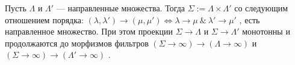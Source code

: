 \SSsect Пусть \( \Lambda \) и \( \Lambda' \) --- направленные множества. Тогда \( \Sigma := \Lambda \times \Lambda' \) со следующим отношением порядка: \( (\lambda,\lambda') \rightarrow (\mu,\mu') \Leftrightarrow \lambda \rightarrow \mu ~\&~  \lambda' \rightarrow \mu' \) , есть направленное множество. При этом проекции \( \Sigma \rightarrow \Lambda \) и \( \Sigma \rightarrow \Lambda' \) монотонны и продолжаются до морфизмов фильтров \( (\Sigma \rightarrow \infty) \rightarrow (\Lambda \rightarrow \infty) \) и \( (\Sigma \rightarrow \infty) \rightarrow (\Lambda' \rightarrow \infty) \) .

\SSsect

\SSsect

\pagebreak

\SSbullet 

\pagebreak

\SSbullet 



